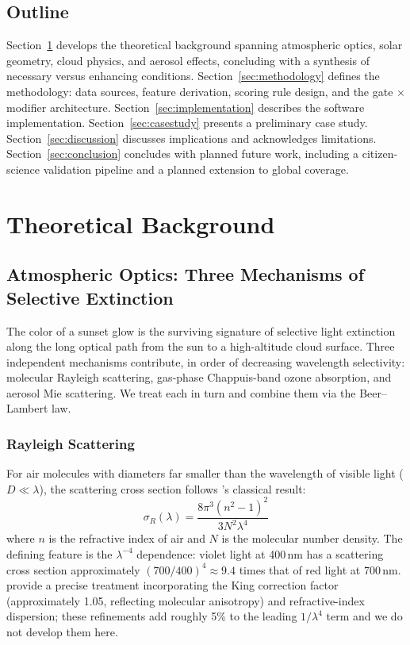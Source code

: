 \documentclass[11pt,a4paper]{article}
\begin{document}
\subsection{Outline}

Section~\ref{sec:theory} develops the theoretical background spanning atmospheric optics, solar geometry, cloud physics, and aerosol effects, concluding with a synthesis of necessary versus enhancing conditions. Section~\ref{sec:methodology} defines the methodology: data sources, feature derivation, scoring rule design, and the gate $\times$ modifier architecture. Section~\ref{sec:implementation} describes the software implementation. Section~\ref{sec:casestudy} presents a preliminary case study. Section~\ref{sec:discussion} discusses implications and acknowledges limitations. Section~\ref{sec:conclusion} concludes with planned future work, including a citizen-science validation pipeline and a planned extension to global coverage.

\section{Theoretical Background}
\label{sec:theory}

\subsection{Atmospheric Optics: Three Mechanisms of Selective Extinction}
\label{sec:atmoptics}

The color of a sunset glow is the surviving signature of selective light extinction along the long optical path from the sun to a high-altitude cloud surface. Three independent mechanisms contribute, in order of decreasing wavelength selectivity: molecular Rayleigh scattering, gas-phase Chappuis-band ozone absorption, and aerosol Mie scattering. We treat each in turn and combine them via the Beer--Lambert law.

\subsubsection{Rayleigh Scattering}

For air molecules with diameters far smaller than the wavelength of visible light ($D \ll \lambda$), the scattering cross section follows \citet{strutt1871scattering}'s classical result:
\begin{equation}
\sigma_R(\lambda) = \frac{8 \pi^3 (n^2 - 1)^2}{3 N^2 \lambda^4}
\label{eq:rayleigh}
\end{equation}
where $n$ is the refractive index of air and $N$ is the molecular number density. The defining feature is the $\lambda^{-4}$ dependence: violet light at 400\,nm has a scattering cross section approximately $(700/400)^4 \approx 9.4$ times that of red light at 700\,nm. \citet{bodhaine1999rayleigh} provide a precise treatment incorporating the King correction factor (approximately 1.05, reflecting molecular anisotropy) and refractive-index dispersion; these refinements add roughly 5\% to the leading $1/\lambda^4$ term and we do not develop them here.
\end{document}
